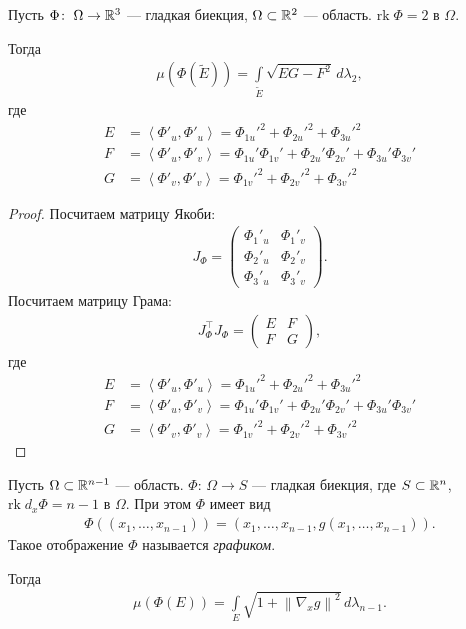 \begin{exmpl}
 Пусть $\Phi \colon\; \Omega \to \mathbb{R}^{3}$ --- гладкая биекция, $\Omega \subset \mathbb{R}^{2}$ --- область. $\mathrm{rk}\; \Phi = 2$  в $\Omega$.

 Тогда
 \begin{align*}
  \mu(\Phi(\tilde E)) = \int\limits_{\tilde E} \sqrt{ EG - F^{2} } \, d\lambda_2
 ,\end{align*}  где \begin{align*}
 E &= \left\langle \Phi'_u, \Phi'_u \right\rangle  = \Phi_{1u}'^{2} + \Phi_{2u}'^{2} + \Phi_{3u}'^{2} \\
 F &= \left\langle \Phi'_u, \Phi'_v \right\rangle = \Phi_{1u}' \Phi_{1v}' + \Phi_{2u}' \Phi_{2v}' + \Phi_{3u}' \Phi_{3v}' \\
 G &= \left\langle \Phi'_v, \Phi'_v \right\rangle  = \Phi_{1v}'^{2} + \Phi_{2v}'^{2} + \Phi_{3v}'^{2}
 \end{align*} 
\end{exmpl}
\begin{proof}
 Посчитаем матрицу Якоби:
 \begin{align*}
  J_{\Phi} = \begin{pmatrix}
   \Phi_1'_u & \Phi_1'_v \\
   \Phi_2'_u & \Phi_2'_v \\
   \Phi_3'_u & \Phi_3'_v
  \end{pmatrix}
 .\end{align*}  Посчитаем матрицу Грама:
 \begin{align*}
  J^{\top}_{\Phi} J_{\Phi} = \begin{pmatrix}
   E & F \\
   F & G
  \end{pmatrix}
 ,\end{align*}  где
 \begin{align*}
 E &= \left\langle \Phi'_u, \Phi'_u \right\rangle  = \Phi_{1u}'^{2} + \Phi_{2u}'^{2} + \Phi_{3u}'^{2} \\
 F &= \left\langle \Phi'_u, \Phi'_v \right\rangle = \Phi_{1u}' \Phi_{1v}' + \Phi_{2u}' \Phi_{2v}' + \Phi_{3u}' \Phi_{3v}' \\
 G &= \left\langle \Phi'_v, \Phi'_v \right\rangle  = \Phi_{1v}'^{2} + \Phi_{2v}'^{2} + \Phi_{3v}'^{2}
 \end{align*} 
\end{proof}

\begin{exmpl}
 Пусть $\Omega \subset \mathbb{R}^{n-1}$ --- область. $\Phi \colon\, \Omega \to S $  --- гладкая биекция, где $S \subset \mathbb{R}^{n}$, $\mathrm{rk}\; d_x \Phi = n - 1$ в $\Omega$. При этом $\Phi$ имеет вид
 \begin{align*}
  \Phi((x_1, \ldots, x_{n-1})) = (x_1, \ldots, x_{n-1}, g(x_1, \ldots, x_{n-1}))
 .\end{align*} Такое отображение $\Phi$ называется \textit{графиком}.

 Тогда
 \begin{align*}
  \mu(\Phi(E)) = \int\limits_{E} \sqrt{1 + \left\| \nabla_x g \right\|^{2}} \, d\lambda_{n-1}  
 .\end{align*} 
\end{exmpl}

